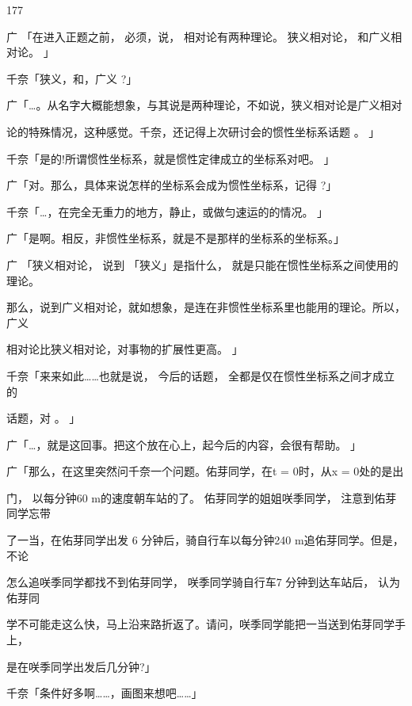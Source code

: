 177\par
广 「在进入正题之前， 必须，说， 相对论有两种理论。 狭义相对论， 和广义相对论。 」\par
千奈「狭义，和，广义 ?」\par
广「…。从名字大概能想象，与其说是两种理论，不如说，狭义相对论是广义相对\par
论的特殊情况，这种感觉。千奈，还记得上次研讨会的惯性坐标系话题 。 」\par
千奈「是的!所谓惯性坐标系，就是惯性定律成立的坐标系对吧。 」\par
广「对。那么，具体来说怎样的坐标系会成为惯性坐标系，记得 ?」\par
千奈「…，在完全无重力的地方，静止，或做匀速运的的情况。 」\par
广「是啊。相反，非惯性坐标系，就是不是那样的坐标系的坐标系。」\par
广 「狭义相对论， 说到 「狭义」是指什么， 就是只能在惯性坐标系之间使用的理论。\par
那么，说到广义相对论，就如想象，是连在非惯性坐标系里也能用的理论。所以，广义\par
相对论比狭义相对论，对事物的扩展性更高。 」\par
千奈「来来如此……也就是说， 今后的话题， 全都是仅在惯性坐标系之间才成立的\par
话题，对 。 」\par
广「…，就是这回事。把这个放在心上，起今后的内容，会很有帮助。 」\par
广「那么，在这里突然问千奈一个问题。佑芽同学，在t = 0时，从x = 0处的是出\par
门， 以每分钟60 m的速度朝车站的了。 佑芽同学的姐姐咲季同学， 注意到佑芽同学忘带\par
了一当，在佑芽同学出发 6 分钟后，骑自行车以每分钟240 m追佑芽同学。但是，不论\par
怎么追咲季同学都找不到佑芽同学， 咲季同学骑自行车7 分钟到达车站后， 认为佑芽同\par
学不可能走这么快，马上沿来路折返了。请问，咲季同学能把一当送到佑芽同学手上，\par
是在咲季同学出发后几分钟?」\par
千奈「条件好多啊……，画图来想吧……」\par

